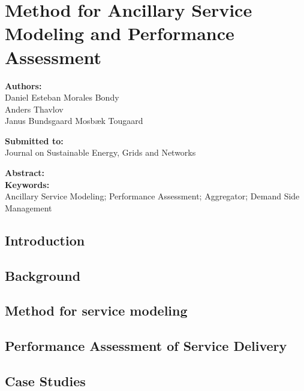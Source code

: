 \chapter{Method for Ancillary Service Modeling and Performance Assessment}

\textbf{Authors:}\\
Daniel Esteban Morales Bondy\\
Anders Thavlov\\
Janus Bundsgaard Mosb{\ae}k Tougaard

\noindent
\textbf{Submitted to:}\\
Journal on Sustainable Energy, Grids and Networks 

\noindent
\textbf{Abstract:}\\


\noindent
\textbf{Keywords:}\\
Ancillary Service Modeling; Performance Assessment; Aggregator; Demand Side Management

\section{Introduction}


\section{Background}\label{sec:SEGANbackground}


\section{Method for service modeling}\label{sec:SEGANmethodology}


\section{Performance Assessment of Service Delivery}\label{sec:SEGANperformance}


\section{Case Studies}\label{sec:SEGANcasestudies}


